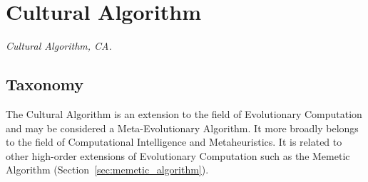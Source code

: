 

\section{Cultural Algorithm} 
\label{sec:cultural_algorithm}

\emph{Cultural Algorithm, CA.}

\subsection{Taxonomy}
The Cultural Algorithm is an extension to the field of Evolutionary Computation and may be considered a Meta-Evolutionary Algorithm. It more broadly belongs to the field of Computational Intelligence and Metaheuristics.
It is related to other high-order extensions of Evolutionary Computation such as the Memetic Algorithm (Section~\ref{sec:memetic_algorithm}).

